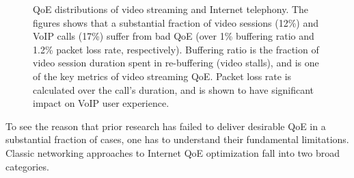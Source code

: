 \begin{figure}[t!]
\captionsetup[subfigure]{justification=centering,farskip=-1pt,captionskip=5pt}
\centering
\caption{QoE distributions of video streaming and Internet telephony. 
The figures shows that a substantial fraction of video sessions (12\%) 
and VoIP calls (17\%) suffer from bad QoE (over 1\% buffering ratio 
and 1.2\% packet loss rate, respectively).
Buffering ratio is the fraction of video session duration spent in 
re-buffering (video stalls), and is one of the key metrics of video 
streaming QoE. 
Packet loss rate is calculated over the call's duration, and is shown to 
have significant impact on VoIP user experience.}
\label{fig:intro:badqoe}
\end{figure}

To see the reason that prior research has failed to deliver desirable 
QoE in a substantial fraction of cases, one has to understand
their fundamental limitations. 
Classic networking approaches to Internet QoE optimization fall
into two broad categories. 


